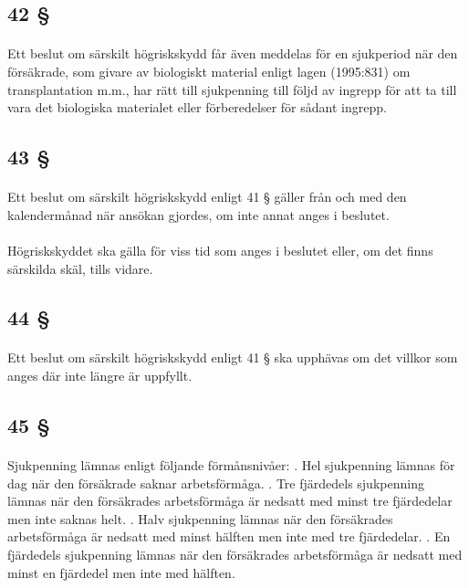 \documentclass[a4paper,notitlepage,openany,10pt]{book}
\begin{document}
\subsection*{42 §}
\paragraph*{}
Ett beslut om särskilt högriskskydd får även meddelas för en sjukperiod när den försäkrade, som givare av biologiskt material enligt lagen (1995:831) om transplantation m.m., har rätt till sjukpenning till följd av ingrepp för att ta till vara det biologiska materialet eller förberedelser för sådant ingrepp.
\subsection*{43 §}
\paragraph*{}
Ett beslut om särskilt högriskskydd enligt 41 § gäller från och med den kalendermånad när ansökan gjordes, om inte annat anges i beslutet.
\paragraph*{}
Högriskskyddet ska gälla för viss tid som anges i beslutet eller, om det finns särskilda skäl, tills vidare.
\subsection*{44 §}
\paragraph*{}
Ett beslut om särskilt högriskskydd enligt 41 § ska upphävas om det villkor som anges där inte längre är uppfyllt.
\subsection*{45 §}
\paragraph*{}
Sjukpenning lämnas enligt följande förmånsnivåer:
. Hel sjukpenning lämnas för dag när den försäkrade saknar arbetsförmåga.
. Tre fjärdedels sjukpenning lämnas när den försäkrades arbetsförmåga är nedsatt med minst tre fjärdedelar men inte saknas helt.
. Halv sjukpenning lämnas när den försäkrades arbetsförmåga är nedsatt med minst hälften men inte med tre fjärdedelar.
. En fjärdedels sjukpenning lämnas när den försäkrades arbetsförmåga är nedsatt med minst en fjärdedel men inte med hälften.
\end{document}
